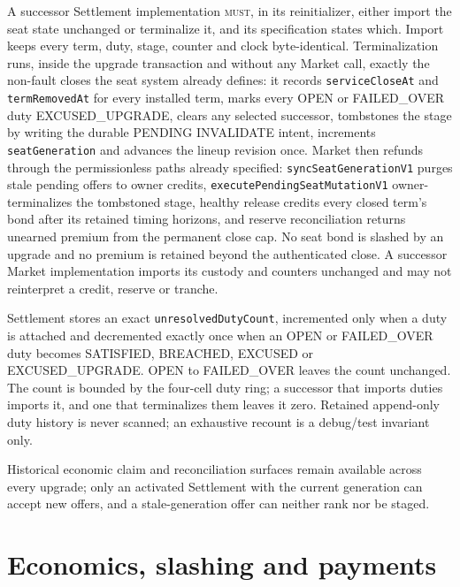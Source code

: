 \documentclass[a4paper,11pt]{article}
\newcommand{\code}[1]{\nolinkurl{#1}}
\newcommand{\must}{\textsc{must}}
\begin{document}
A successor Settlement implementation \must, in its reinitializer, either
import the seat state unchanged or terminalize it, and its specification
states which.  Import keeps every term, duty, stage, counter and clock
byte-identical.  Terminalization runs, inside the upgrade transaction and
without any Market call, exactly the non-fault closes the seat system already
defines: it records \code{serviceCloseAt} and \code{termRemovedAt} for every
installed term, marks every OPEN or FAILED\_OVER duty EXCUSED\_UPGRADE, clears
any selected successor, tombstones the stage by writing the durable PENDING
INVALIDATE intent, increments \code{seatGeneration} and advances the lineup
revision once.  Market then refunds through the permissionless paths already
specified: \code{syncSeatGenerationV1} purges stale pending offers to owner
credits, \code{executePendingSeatMutationV1} owner-terminalizes the tombstoned
stage, healthy release credits every closed term's bond after its retained
timing horizons, and reserve reconciliation returns unearned premium from the
permanent close cap.  No seat bond is slashed by an upgrade and no premium is
retained beyond the authenticated close.  A successor Market implementation
imports its custody and counters unchanged and may not reinterpret a credit,
reserve or tranche.

Settlement stores an exact \code{unresolvedDutyCount}, incremented only when a
duty is attached and decremented exactly once when an OPEN or FAILED\_OVER duty
becomes SATISFIED, BREACHED, EXCUSED or EXCUSED\_UPGRADE.  OPEN to
FAILED\_OVER leaves the count unchanged.  The count is bounded by the four-cell
duty ring; a successor that imports duties imports it, and one that
terminalizes them leaves it zero.  Retained append-only duty history is never
scanned; an exhaustive recount is a debug/test invariant only.

Historical economic claim and reconciliation surfaces remain available across
every upgrade; only an activated Settlement with the current generation can
accept new offers, and a stale-generation offer can neither rank nor be
staged.

\section{Economics, slashing and payments}\label{sec:economics}
\end{document}
